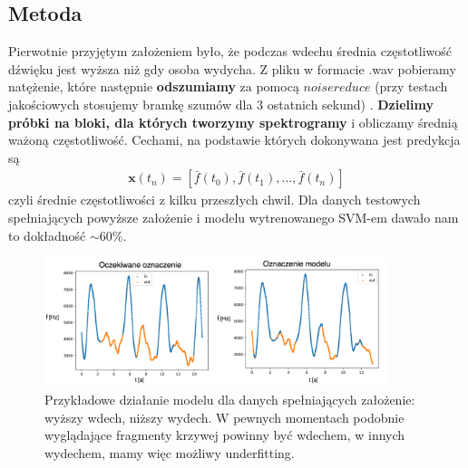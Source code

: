 \documentclass[polish]{article}
\begin{document}
\subsection{Metoda}
Pierwotnie przyjętym założeniem było, że podczas wdechu średnia częstotliwość dźwięku jest wyższa niż
gdy osoba wydycha. Z pliku w formacie .wav pobieramy natężenie, które następnie \textbf{odszumiamy} za pomocą $noisereduce$ (przy testach jakościowych stosujemy bramkę szumów dla 3 ostatnich sekund) . 
\textbf{Dzielimy próbki na bloki, dla których tworzymy spektrogramy} i obliczamy
średnią ważoną częstotliwość.
Cechami, na podstawie których dokonywana jest predykcja są  
\begin{gather*}
\boldsymbol x (t_n) = [\bar{f}(t_0), \bar{f}(t_1), ..., \bar{f}(t_n)]
\end{gather*}
czyli średnie częstotliwości z kilku przeszłych chwil.
Dla danych testowych spełniających powyższe założenie i modelu wytrenowanego SVM-em dawało nam to dokładność $\sim 60\%$.
\begin{figure}[H]
	\centering
	\includegraphics[width=10cm]{porownanie_srednie}
	\caption{Przykładowe działanie modelu dla danych spełniających założenie: wyższy wdech, niższy wydech.
	W pewnych momentach podobnie wyglądające fragmenty krzywej powinny być wdechem, w innych wydechem, mamy więc możliwy underfitting.}
\end{figure}
\end{document}
